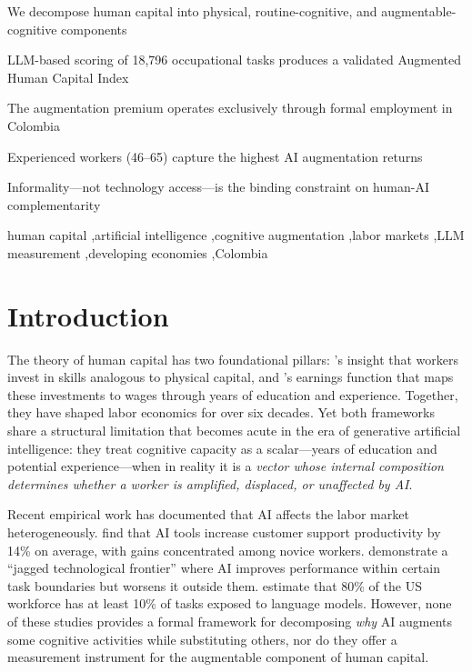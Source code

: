 \documentclass[a4paper,fleqn]{cas-dc}
\begin{document}
\begin{highlights}
\item We decompose human capital into physical, routine-cognitive, and augmentable-cognitive components
\item LLM-based scoring of 18,796 occupational tasks produces a validated Augmented Human Capital Index
\item The augmentation premium operates exclusively through formal employment in Colombia
\item Experienced workers (46--65) capture the highest AI augmentation returns
\item Informality---not technology access---is the binding constraint on human-AI complementarity
\end{highlights}

\begin{keywords}
human capital \sep artificial intelligence \sep cognitive augmentation \sep labor markets \sep LLM measurement \sep developing economies \sep Colombia
\end{keywords}

\maketitle

\section{Introduction}
\label{sec:intro}

The theory of human capital has two foundational pillars: \citet{becker1964human}'s insight that workers invest in skills analogous to physical capital, and \citet{mincer1974schooling}'s earnings function that maps these investments to wages through years of education and experience. Together, they have shaped labor economics for over six decades. Yet both frameworks share a structural limitation that becomes acute in the era of generative artificial intelligence: they treat cognitive capacity as a scalar---years of education and potential experience---when in reality it is a \textit{vector whose internal composition determines whether a worker is amplified, displaced, or unaffected by AI}.

Recent empirical work has documented that AI affects the labor market heterogeneously. \citet{brynjolfsson2025generative} find that AI tools increase customer support productivity by 14\% on average, with gains concentrated among novice workers. \citet{dellacqua2023jagged} demonstrate a ``jagged technological frontier'' where AI improves performance within certain task boundaries but worsens it outside them. \citet{eloundou2024gpts} estimate that 80\% of the US workforce has at least 10\% of tasks exposed to language models. However, none of these studies provides a formal framework for decomposing \textit{why} AI augments some cognitive activities while substituting others, nor do they offer a measurement instrument for the augmentable component of human capital.
\end{document}
